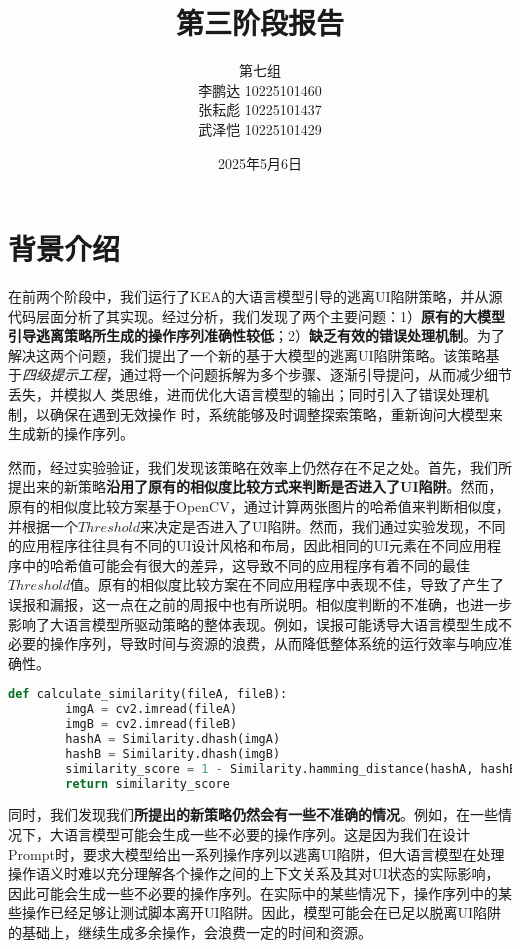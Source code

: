 \documentclass{article}
\title{\heiti\textbf{第三阶段报告}}
\author{第七组 \\ 
李鹏达 10225101460 \\
张耘彪 10225101437 \\
武泽恺 10225101429
}
\date{2025年5月6日}
\begin{document}
\maketitle

\renewcommand\arraystretch{1.4}

\section{背景介绍}

在前两个阶段中，我们运行了K{\small\MakeUppercase{ea}}的大语言模型引导的逃离UI陷阱策略，并从源代码层面分析了其实现。经过分析，我们发现了两个主要问题：1）\textbf{原有的大模型引导逃离策略所生成的操作序列准确性较低}；2）\textbf{缺乏有效的错误处理机制}。为了解决这两个问题，我们提出了一个新的基于大模型的逃离UI陷阱策略。该策略基于\textit{四级提示工程}，通过将一个问题拆解为多个步骤、逐渐引导提问，从而减少细节丢失，并模拟人
类思维，进而优化大语言模型的输出；同时引入了错误处理机制，以确保在遇到无效操作
时，系统能够及时调整探索策略，重新询问大模型来生成新的操作序列。

然而，经过实验验证，我们发现该策略在效率上仍然存在不足之处。首先，我们所提出来的新策略\textbf{沿用了原有的相似度比较方式来判断是否进入了UI陷阱}。然而，原有的相似度比较方案基于OpenCV，通过计算两张图片的哈希值来判断相似度，并根据一个$Threshold$来决定是否进入了UI陷阱。然而，我们通过实验发现，不同的应用程序往往具有不同的UI设计风格和布局，因此相同的UI元素在不同应用程序中的哈希值可能会有很大的差异，这导致不同的应用程序有着不同的最佳$Threshold$值。原有的相似度比较方案在不同应用程序中表现不佳，导致了产生了误报和漏报，这一点在之前的周报中也有所说明。相似度判断的不准确，也进一步影响了大语言模型所驱动策略的整体表现。例如，误报可能诱导大语言模型生成不必要的操作序列，导致时间与资源的浪费，从而降低整体系统的运行效率与响应准确性。

\begin{lstlisting}[language=python, caption=相似度计算代码]
    def calculate_similarity(fileA, fileB):
        imgA = cv2.imread(fileA)
        imgB = cv2.imread(fileB)
        hashA = Similarity.dhash(imgA)
        hashB = Similarity.dhash(imgB)
        similarity_score = 1 - Similarity.hamming_distance(hashA, hashB) / 64.0 
        return similarity_score
\end{lstlisting}

同时，我们发现我们\textbf{所提出的新策略仍然会有一些不准确的情况}。例如，在一些情况下，大语言模型可能会生成一些不必要的操作序列。这是因为我们在设计Prompt时，要求大模型给出一系列操作序列以逃离UI陷阱，但大语言模型在处理操作语义时难以充分理解各个操作之间的上下文关系及其对UI状态的实际影响，因此可能会生成一些不必要的操作序列。在实际中的某些情况下，操作序列中的某些操作已经足够让测试脚本离开UI陷阱。因此，模型可能会在已足以脱离UI陷阱的基础上，继续生成多余操作，会浪费一定的时间和资源。
\end{document}
